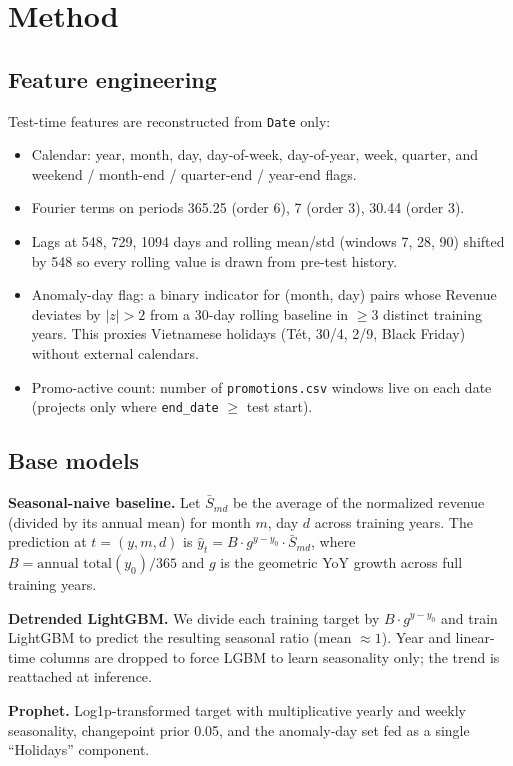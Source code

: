 \documentclass{article}
\begin{document}
\section{Method}

\subsection{Feature engineering}
Test-time features are reconstructed from \texttt{Date} only:
\begin{itemize}
  \item Calendar: year, month, day, day-of-week, day-of-year, week, quarter,
    and weekend / month-end / quarter-end / year-end flags.
  \item Fourier terms on periods 365.25 (order 6), 7 (order 3), 30.44 (order 3).
  \item Lags at 548, 729, 1094 days and rolling mean/std (windows 7, 28, 90)
    shifted by 548 so every rolling value is drawn from pre-test history.
  \item Anomaly-day flag: a binary indicator for (month, day) pairs whose
    Revenue deviates by $|z| > 2$ from a 30-day rolling baseline in $\ge 3$
    distinct training years. This proxies Vietnamese holidays (T\'{e}t,
    30/4, 2/9, Black Friday) without external calendars.
  \item Promo-active count: number of \texttt{promotions.csv} windows live on
    each date (projects only where \texttt{end\_date} $\ge$ test start).
\end{itemize}

\subsection{Base models}
\textbf{Seasonal-naive baseline.} Let $\bar S_{md}$ be the average of the
normalized revenue (divided by its annual mean) for month $m$, day $d$ across
training years. The prediction at $t = (y, m, d)$ is
$\hat y_t = B \cdot g^{y - y_0} \cdot \bar S_{md}$,
where $B = \text{annual total}(y_0) / 365$ and $g$ is the geometric YoY
growth across full training years.

\textbf{Detrended LightGBM.} We divide each training target by
$B \cdot g^{y - y_0}$ and train LightGBM to predict the resulting seasonal
ratio (mean $\approx 1$). Year and linear-time columns are dropped to force
LGBM to learn seasonality only; the trend is reattached at inference.

\textbf{Prophet.} Log1p-transformed target with multiplicative yearly and
weekly seasonality, changepoint prior 0.05, and the anomaly-day set fed as a
single ``Holidays'' component.
\end{document}
